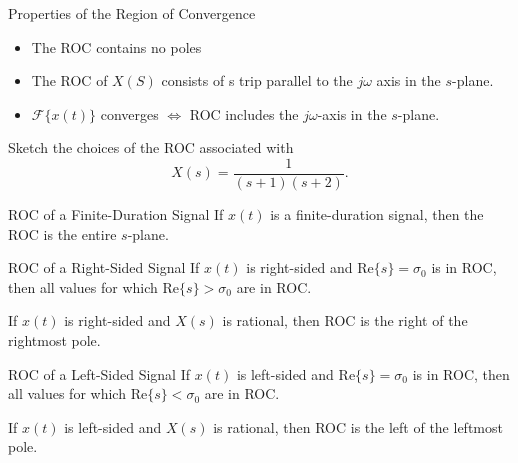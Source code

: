 \begin{frame}{Properties of the Region of Convergence}
    \begin{itemize}
        \item The ROC contains no poles
        \item The ROC of $X(S)$ consists of s trip parallel to the $j\omega$ axis in the $s$-plane.
        \item $\mathcal{F}\{x(t)\}$ converges $\Leftrightarrow$ ROC includes the $j\omega$-axis in the $s$-plane.
    \end{itemize}
\end{frame}


\begin{frame}[t]{}
    \begin{example}
        Sketch the choices of the ROC associated with
        \begin{equation*}
            X(s) = \frac{1}{(s+1)(s+2)}.
        \end{equation*}
    \end{example}
    \pause
    {
            

    }
\end{frame}

\begin{frame}{ROC of a Finite-Duration Signal}
    If $x(t)$ is a finite-duration signal, then the ROC is the entire $s$-plane.

    {
        
    }
\end{frame}


\begin{frame}{ROC of a Right-Sided Signal}
    If $x(t)$ is right-sided and $\mathrm{Re}\{s\} = \sigma_0$ is in ROC, then all values for which $\mathrm{Re}\{s\} > \sigma_0$ are in ROC.

    {
        
    }

    {
        If $x(t)$ is right-sided and $X(s)$ is rational, then ROC is the right of the rightmost pole.
    }
\end{frame}

\begin{frame}{ROC of a Left-Sided Signal}
    If $x(t)$ is left-sided and $\mathrm{Re}\{s\} = \sigma_0$ is in ROC, then all values for which $\mathrm{Re}\{s\} < \sigma_0$ are in ROC.


    {
        If $x(t)$ is left-sided and $X(s)$ is rational, then ROC is the left of the leftmost pole.
    }
\end{frame}

